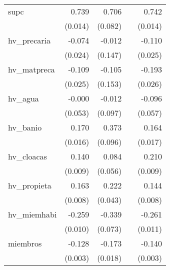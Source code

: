 {\begin{longtable}{l*{4}{D{.}{.}{-1}}}
\addlinespace
supc        &       0.739\sym{***}&       0.706\sym{***}&                     &       0.742\sym{***}\\
            &     (0.014)         &     (0.082)         &                     &     (0.014)         \\
\addlinespace
hv\_precaria &      -0.074\sym{**} &      -0.012         &                     &      -0.110\sym{***}\\
            &     (0.024)         &     (0.147)         &                     &     (0.025)         \\
\addlinespace
hv\_matpreca &      -0.109\sym{***}&      -0.105         &                     &      -0.193\sym{***}\\
            &     (0.025)         &     (0.153)         &                     &     (0.026)         \\
\addlinespace
hv\_agua     &      -0.000         &      -0.012         &                     &      -0.096         \\
            &     (0.053)         &     (0.097)         &                     &     (0.057)         \\
\addlinespace
hv\_banio    &       0.170\sym{***}&       0.373\sym{***}&                     &       0.164\sym{***}\\
            &     (0.016)         &     (0.096)         &                     &     (0.017)         \\
\addlinespace
hv\_cloacas  &       0.140\sym{***}&       0.084         &                     &       0.210\sym{***}\\
            &     (0.009)         &     (0.056)         &                     &     (0.009)         \\
\addlinespace
hv\_propieta &       0.163\sym{***}&       0.222\sym{***}&                     &       0.144\sym{***}\\
            &     (0.008)         &     (0.043)         &                     &     (0.008)         \\
\addlinespace
hv\_miemhabi &      -0.259\sym{***}&      -0.339\sym{***}&                     &      -0.261\sym{***}\\
            &     (0.010)         &     (0.073)         &                     &     (0.011)         \\
\addlinespace
miembros    &      -0.128\sym{***}&      -0.173\sym{***}&                     &      -0.140\sym{***}\\
            &     (0.003)         &     (0.018)         &                     &     (0.003)         \\

\end{longtable}}
